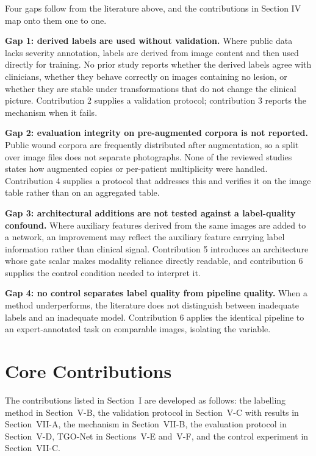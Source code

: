Four gaps follow from the literature above, and the contributions in
Section IV map onto them one to one.

\textbf{Gap 1: derived labels are used without validation.} Where public
data lacks severity annotation, labels are derived from image content and
then used directly for training. No prior study reports whether the derived
labels agree with clinicians, whether they behave correctly on images
containing no lesion, or whether they are stable under transformations that
do not change the clinical picture. Contribution 2 supplies a validation
protocol; contribution 3 reports the mechanism when it fails.

\textbf{Gap 2: evaluation integrity on pre-augmented corpora is not
reported.} Public wound corpora are frequently distributed after
augmentation, so a split over image files does not separate photographs.
None of the reviewed studies states how augmented copies or per-patient
multiplicity were handled. Contribution 4 supplies a protocol that
addresses this and verifies it on the image table rather than on an
aggregated table.

\textbf{Gap 3: architectural additions are not tested against a
label-quality confound.} Where auxiliary features derived from the same
images are added to a network, an improvement may reflect the auxiliary
feature carrying label information rather than clinical signal.
Contribution 5 introduces an architecture whose gate scalar makes modality
reliance directly readable, and contribution 6 supplies the control
condition needed to interpret it.

\textbf{Gap 4: no control separates label quality from pipeline quality.}
When a method underperforms, the literature does not distinguish between
inadequate labels and an inadequate model. Contribution 6 applies the
identical pipeline to an expert-annotated task on comparable images,
isolating the variable.

\section{Core Contributions}

The contributions listed in Section~I are developed as follows: the
labelling method in Section~V-B, the validation protocol in Section~V-C
with results in Section~VII-A, the mechanism in Section~VII-B, the
evaluation protocol in Section~V-D, TGO-Net in Sections~V-E and~V-F, and
the control experiment in Section~VII-C.